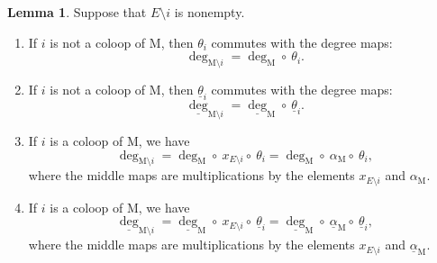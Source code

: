 \documentclass[11pt,reqno]{amsart}
\theoremstyle{definition}
\newtheorem{lemma}[theorem]{Lemma}
\theoremstyle{remark}
\renewcommand{\(}{\left(}
\renewcommand{\)}{\right)}
\newcommand{\<}{\left<}
\renewcommand{\>}{\right>}
\renewcommand{\and}{\qquad\text{and}\qquad}
\begin{document}
\begin{lemma}\label{lemma_PoincareCompatible}
Suppose that $E\setminus i$ is nonempty.
\begin{enumerate}[(1)]\itemsep 5pt
\item If $i$ is not a coloop of $\mathrm{M}$, then $\theta_i$ commutes with the degree maps:
\[
\deg_{\mathrm{M}\setminus i}=\deg_{\mathrm{M}} \circ\ \theta_i. %
\]
\item If $i$ is not a coloop of $\mathrm{M}$, then $\underline{\theta}_i$ commutes with the degree maps:
\[
\underline{\deg}_{\mathrm{M}\setminus i}= \underline{\deg}_{\mathrm{M}} \circ\ \underline{\theta}_i.
\]
\item If $i$ is a coloop of $\mathrm{M}$, we have
\[
\deg_{\mathrm{M}\setminus i}%
=\deg_{\mathrm{M}} \circ\ x_{E \setminus i} \circ\ \theta_i 
=\deg_{\mathrm{M}} \circ\ \alpha_{\mathrm{M}} \circ\ \theta_i, 
\]
where the middle maps are multiplications by the elements $x_{E \setminus i}$ and $\alpha_\mathrm{M}$.
\item If $i$ is a coloop of $\mathrm{M}$, we have
\[
\underline{\deg}_{\mathrm{M}\setminus i}%
=\underline{\deg}_{\mathrm{M}} \circ\ x_{E \setminus i} \circ\ \underline{\theta}_i
=\underline{\deg}_{\mathrm{M}} \circ\ \underline{\alpha}_\mathrm{M} \circ\ \underline{\theta}_i,
\]
where the middle maps are multiplications by the elements $x_{E \setminus i}$ and $\underline{\alpha}_\mathrm{M}$.
\end{enumerate}
\end{lemma}
\end{document}

